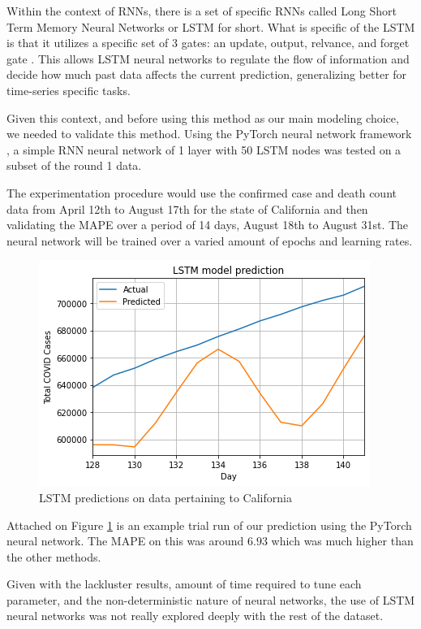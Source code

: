 \documentclass[sigconf,nonacm]{acmart}
\begin{document}
Within the context of RNNs, there is a set of specific RNNs called Long Short Term Memory Neural Networks or LSTM for short. What is specific of the LSTM is that it utilizes a specific set of 3 gates: an update, output, relvance, and forget gate \cite{LSTMlecture}. This allows LSTM neural networks to regulate the flow of information and decide how much past data affects the current prediction, generalizing better for time-series specific tasks.

Given this context, and before using this method as our main modeling choice, we needed to validate this method. Using the PyTorch neural network framework \cite{Pytorch}, a simple RNN neural network of 1 layer with 50 LSTM nodes was tested on a subset of the round 1 data. 

The experimentation procedure would use the confirmed case and death count data from April 12th to August 17th for the state of California and then validating the MAPE over a period of 14 days, August 18th to August 31st. The neural network will be trained over a varied amount of epochs and learning rates. 

\begin{figure}
  \centering
  \includegraphics[width=\linewidth]{figures/LSTMPytorch.png}
  \caption{LSTM predictions on data pertaining to California}
  \label{fig:LSTM_trial}
\end{figure}

Attached on Figure  \ref{fig:LSTM_trial} is an example trial run of our prediction using the PyTorch neural network. The MAPE on this was around $6.93$ which was much higher than the other methods.

Given with the lackluster results, amount of time required to tune each parameter, and the non-deterministic nature of neural networks, the use of LSTM neural networks was not really explored deeply with the rest of the dataset.
\end{document}
